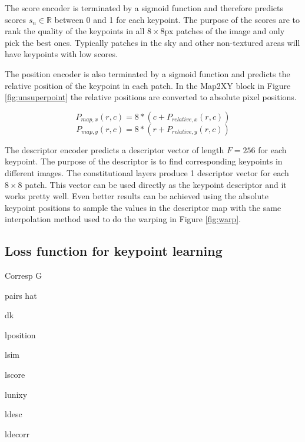 The score encoder is terminated by a sigmoid function and therefore predicts scores $s_n \in \mathbb{R} $ between 0 and 1 for each keypoint. The purpose of the scores are to rank the quality of the keypoints in all $8\times 8$px patches of the image and only pick the best ones. Typically patches in the sky and other non-textured areas will have keypoints with low scores.

The position encoder is also terminated by a sigmoid function and predicts the relative position of the keypoint in each patch. In the Map2XY block in Figure \ref{fig:unsuperpoint} the relative positions are converted to absolute pixel positions.

\[
P_{map,x}(r,c) = 8 * (c + P_{relative,x}(r,c))
\]
\[
P_{map,y}(r,c) = 8 * (r + P_{relative,y}(r,c))
\]

The descriptor encoder predicts a descriptor vector of length $F=256$ for each keypoint. The purpose of the descriptor is to find corresponding keypoints in different images. The constitutional layers produce 1 descriptor vector for each $8\times 8$ patch. This vector can be used directly as the keypoint descriptor and it works pretty well. Even better results can be achieved using the absolute keypoint positions to sample the values in the descriptor map with the same interpolation method used to do the warping in Figure \ref{fig:warp}.


\subsection{Loss function for keypoint learning}

Corresp G

pairs hat

dk

lposition

lsim

lscore

lunixy

ldesc

ldecorr
